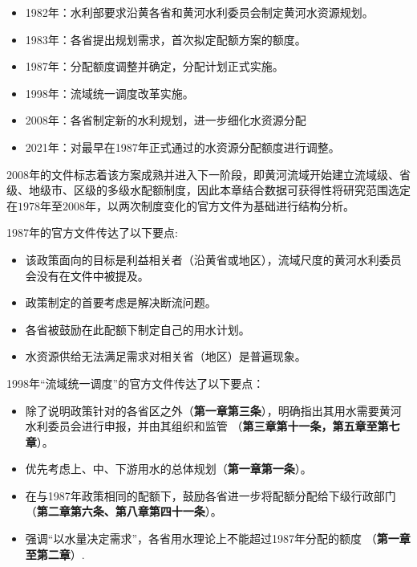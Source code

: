 \begin{itemize}
    \item 1982年：水利部要求沿黄各省和黄河水利委员会制定黄河水资源规划\cite{wang2019, wang2019a}。
    \item 1983年：各省提出规划需求，首次拟定配额方案的额度。
    \item 1987年：分配额度调整并确定，分配计划正式实施。
    \item 1998年：流域统一调度改革实施。
    \item 2008年：各省制定新的水利规划，进一步细化水资源分配\cite{wang2019,wang2019a}
    \item 2021年：对最早在1987年正式通过的水资源分配额度进行调整。
\end{itemize}

$2008$年的文件标志着该方案成熟并进入下一阶段，即黄河流域开始建立流域级、省级、地级市、区级的多级水配额制度，因此本章结合数据可获得性将研究范围选定在$1978$年至$2008$年，以两次制度变化的官方文件为基础进行结构分析。

1987年的官方文件传达了以下要点:

\begin{itemize}
	\item 该政策面向的目标是利益相关者（沿黄省或地区），流域尺度的黄河水利委员会没有在文件中被提及。
	\item 政策制定的首要考虑是解决断流问题。
	\item 各省被鼓励在此配额下制定自己的用水计划。
	\item 水资源供给无法满足需求对相关省（地区）是普遍现象。
\end{itemize}

1998年“流域统一调度”的官方文件传达了以下要点：

\begin{itemize}
	\item 除了说明政策针对的各省区之外（\textbf{第一章第三条}），明确指出其用水需要黄河水利委员会进行申报，并由其组织和监管 （\textbf{第三章第十一条，第五章至第七章}）。
	\item 优先考虑上、中、下游用水的总体规划（\textbf{第一章第一条}）。
	\item 在与1987年政策相同的配额下，鼓励各省进一步将配额分配给下级行政部门（\textbf{第二章第六条、第八章第四十一条}）。
	\item 强调“以水量决定需求”，各省用水理论上不能超过1987年分配的额度 （\textbf{第一章至第二章}）.
\end{itemize}

